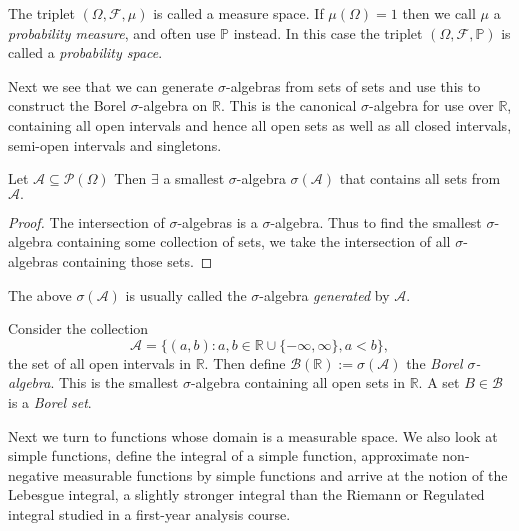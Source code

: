 \begin{remark}
    The triplet $(\Omega,\mathcal{F},\mu)$ is called a measure space. If $\mu(\Omega)
    =1$ then we call $\mu$ a \emph{probability measure}, and often use $\mathbb{P}$ 
    instead. In this case the triplet $(\Omega,\mathcal{F},\mathbb{P})$ is called a 
    \emph{probability space}.
\end{remark}

Next we see that we can generate $\sigma$-algebras from sets of sets and use 
this to construct the Borel $\sigma$-algebra on $\mathbb{R}$. This is the canonical
$\sigma$-algebra for use over $\mathbb{R}$, containing all open intervals and hence all 
open sets as well as all closed intervals, semi-open intervals and singletons.
\begin{lemma}
    Let $\mathcal{A}\subseteq\mathcal{P}(\Omega)$ Then $\exists$ a smallest $\sigma$-algebra 
    $\sigma(\mathcal{A})$ that contains all sets from $\mathcal{A}.$
\end{lemma}
\begin{proof}
    The intersection of $\sigma$-algebras is a $\sigma$-algebra. Thus to find the 
    smallest $\sigma$-algebra containing some collection of sets, we take the intersection
    of all $\sigma$-algebras containing those sets.
\end{proof}

\begin{remark}
    The above $\sigma(\mathcal{A})$ is usually called the $\sigma$-algebra
    \emph{generated} by $\mathcal{A}$.
\end{remark}

\begin{definition}
    Consider the collection 
    \begin{equation*}
        \mathcal{A}=\{(a,b):a,b\in\mathbb{R}\cup\{-\infty,\infty\},a<b\},
    \end{equation*}
    the set of all open intervals in $\mathbb{R}$. Then define 
    $\mathcal{B}(\mathbb{R}):=\sigma(\mathcal{A})$ the \emph{Borel 
    $\sigma$-algebra}. This is the smallest $\sigma$-algebra containing all open
    sets in $\mathbb{R}$. A set $B\in\mathcal{B}$ is a \emph{Borel set}.
\end{definition}

Next we turn to functions whose domain is a measurable space. We also look at simple 
functions, define the integral of a simple function, approximate non-negative measurable
functions by simple functions and arrive at the notion of the Lebesgue integral, a slightly
stronger integral than the Riemann or Regulated integral studied in a first-year analysis 
course.

